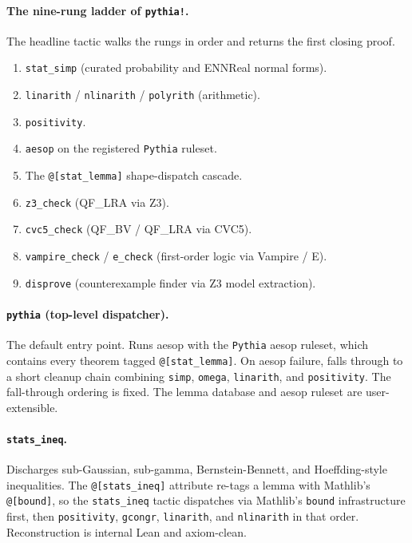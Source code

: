 \paragraph{The nine-rung ladder of \texttt{pythia!}.}
The headline tactic walks the rungs in order and returns the first
closing proof.
\begin{enumerate}[leftmargin=1.5em,itemsep=0.1em]
\item \texttt{stat\_simp} (curated probability and ENNReal normal
  forms).
\item \texttt{linarith} / \texttt{nlinarith} / \texttt{polyrith}
  (arithmetic).
\item \texttt{positivity}.
\item \texttt{aesop} on the registered \texttt{Pythia} ruleset.
\item The \texttt{@[stat\_lemma]} shape-dispatch cascade.
\item \texttt{z3\_check} (QF\_LRA via Z3).
\item \texttt{cvc5\_check} (QF\_BV / QF\_LRA via CVC5).
\item \texttt{vampire\_check} / \texttt{e\_check} (first-order logic
  via Vampire / E).
\item \texttt{disprove} (counterexample finder via Z3 model
  extraction).
\end{enumerate}

\paragraph{\texttt{pythia} (top-level dispatcher).}
The default entry point. Runs aesop with the \texttt{Pythia} aesop
ruleset, which contains every theorem tagged
\texttt{@[stat\_lemma]}. On aesop failure, falls through to a
short cleanup chain combining \texttt{simp}, \texttt{omega},
\texttt{linarith}, and \texttt{positivity}. The fall-through
ordering is fixed. The lemma database and aesop ruleset are
user-extensible.

\paragraph{\texttt{stats\_ineq}.}
Discharges sub-Gaussian, sub-gamma, Bernstein-Bennett, and
Hoeffding-style inequalities. The \texttt{@[stats\_ineq]} attribute
re-tags a lemma with Mathlib's \texttt{@[bound]}, so the
\texttt{stats\_ineq} tactic dispatches via Mathlib's \texttt{bound}
infrastructure first, then \texttt{positivity}, \texttt{gcongr},
\texttt{linarith}, and \texttt{nlinarith} in that order.
Reconstruction is internal Lean and axiom-clean.

